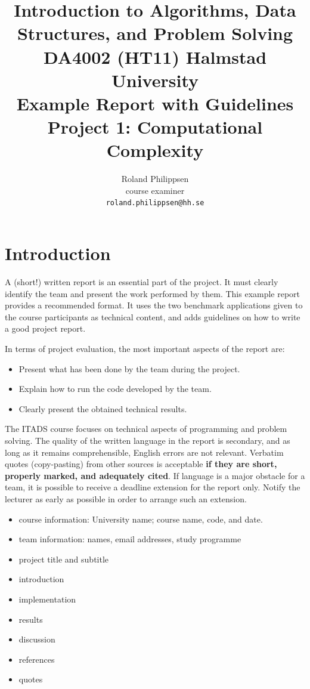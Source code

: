 \documentclass[a4paper,10pt]{article}
\begin{document}
\title{
  {\normalsize
    Introduction to Algorithms, Data Structures, and Problem Solving\\
    DA4002 (HT11) Halmstad University}\\
  Example Report with Guidelines\\
  Project 1: Computational Complexity
}
\author{
  Roland Philippsen\\
  course examiner\\
  \texttt{roland.philippsen@hh.se}
}
\maketitle



\section{Introduction}

A (short!) written report is an essential part of the project.
It must clearly identify the team and present the work performed by them.
This example report provides a recommended format.
It uses the two benchmark applications given to the course participants as technical content, and adds guidelines on how to write a good project report.

In terms of project evaluation, the most important aspects of the report are:
\begin{itemize}
\item Present what has been done by the team during the project.
\item Explain how to run the code developed by the team.
\item Clearly present the obtained technical results.
\end{itemize}

The ITADS course focuses on technical aspects of programming and problem solving.
The quality of the written language in the report is secondary, and as long as it remains comprehensible, English errors are not relevant.
Verbatim quotes (copy-pasting) from other sources is acceptable \textbf{if they are short, properly marked, and adequately cited}.
If language is a major obstacle for a team, it is possible to receive a deadline extension for the report only.
Notify the lecturer as early as possible in order to arrange such an extension.

\begin{itemize}
\item course information: University name; course name, code, and date.
\item team information: names, email addresses, study programme
\item project title and subtitle
\item introduction
\item implementation
\item results
\item discussion
\item references
\item quotes
\end{itemize}
\end{document}
